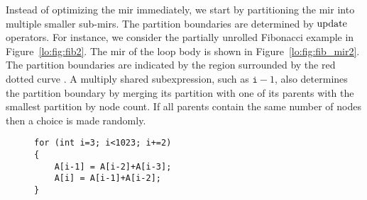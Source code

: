 Instead of optimizing the \gls{mir} immediately, we start by partitioning the
\gls{mir} into multiple smaller sub-\glspl{mir}.  The partition boundaries are
determined by $\operatorname{\mathrm{update}}$ operators.  For instance, we consider the partially
unrolled Fibonacci example in Figure~\ref{lo:fig:fib2}.  The \gls{mir} of the
loop body is shown in Figure~\ref{lo:fig:fib_mir2}.  The partition boundaries
are indicated by the region surrounded by the red dotted curve .  A multiply shared
subexpression, such as $\texttt{i} - 1$, also determines the partition boundary
by merging its partition with one of its parents with the smallest partition by
node count.  If all parents contain the same number of nodes then a choice is
made randomly.
\begin{figure}[ht]
    \centering
    \newsavebox{\fiblstb}
    \begin{lrbox}{\fiblstb}
        \begin{lstlisting}
for (int i=3; i<1023; i+=2)
{
    A[i-1] = A[i-2]+A[i-3];
    A[i] = A[i-1]+A[i-2];
}
        \end{lstlisting}
    \end{lrbox}
\end{figure}
